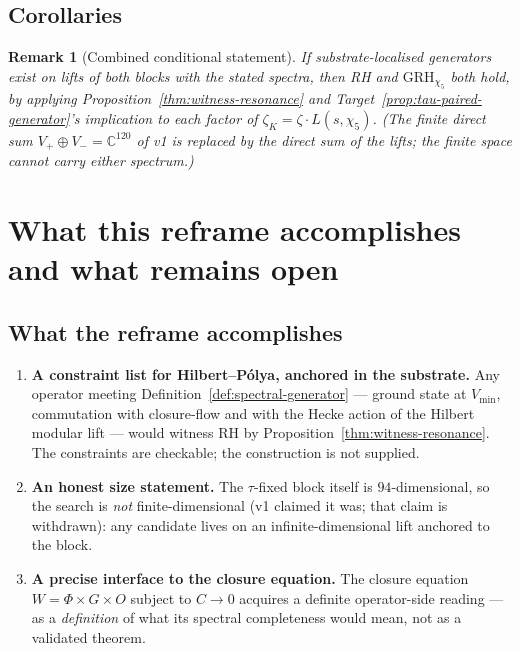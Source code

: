 \documentclass[11pt,a4paper]{article}
\newtheorem{remark}[theorem]{Remark}
\newcommand{\C}{\mathbb{C}}
\newcommand{\Vmin}{V_{\min}}
\newcommand{\Wit}{W}
\begin{document}
\subsection{Corollaries}

\begin{remark}[Combined conditional statement]
\label{cor:combined}
If substrate-localised generators exist on lifts of both blocks
with the stated spectra, then RH and $\mathrm{GRH}_{\chi_5}$ both
hold, by applying Proposition~\ref{thm:witness-resonance} and
Target~\ref{prop:tau-paired-generator}'s implication to each
factor of $\zeta_K = \zeta \cdot L(s,\chi_5)$. (The finite
direct sum $V_+ \oplus V_- = \C^{120}$ of v1 is replaced by the
direct sum of the lifts; the finite space cannot carry either
spectrum.)
\end{remark}

\section{What this reframe accomplishes and what remains open}
\label{sec:scope}

\subsection{What the reframe accomplishes}

\begin{enumerate}[leftmargin=*]
  \item \textbf{A constraint list for Hilbert--P\'olya, anchored
        in the substrate.} Any operator meeting
        Definition~\ref{def:spectral-generator} --- ground state at
        $\Vmin$, commutation with closure-flow and with the Hecke
        action of the Hilbert modular lift --- would witness RH by
        Proposition~\ref{thm:witness-resonance}. The constraints
        are checkable; the construction is not supplied.
  \item \textbf{An honest size statement.} The $\tau$-fixed
        block itself is $94$-dimensional, so the search is
        \emph{not} finite-dimensional (v1 claimed it was; that
        claim is withdrawn): any candidate lives on an
        infinite-dimensional lift anchored to the block.
  \item \textbf{A precise interface to the closure equation.}
        The closure equation $\Wit = \Phi \times G \times O$
        subject to $C \to 0$ acquires a definite operator-side
        reading --- as a \emph{definition} of what its spectral
        completeness would mean, not as a validated theorem.
\end{enumerate}
\end{document}
